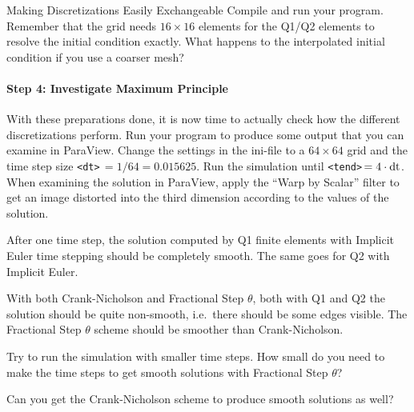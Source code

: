 \documentclass[12pt,a4paper]{article}
\begin{document}
\begin{Exercise}{Making Discretizations Easily Exchangeable}
  Compile and run your program.
  Remember that the grid needs $16\times16$ elements for the Q1/Q2 elements to
  resolve the initial condition exactly.  What happens to the interpolated
  initial condition if you use a coarser mesh?

  \paragraph{Step 4: Investigate Maximum Principle}

  \lstset{language=bash} With these preparations done, it is now time to
  actually check how the different discretizations perform.  Run your program
  to produce some output that you can examine in ParaView. Change the
  settings in the ini-file to a $64\times 64$ grid and the time step size
  \lstinline!<dt>!$\,=1/64=0.015625$. Run the simulation until
  \lstinline!<tend>!$\,=4 \cdot\textup{dt}$.
  When examining the solution in ParaView, apply the ``Warp by Scalar''
  filter to get an image distorted into the third dimension according to
  the values of the solution.

  After one time step, the solution computed by Q1 finite elements with
  Implicit Euler time stepping should be completely smooth.  The same goes for
  Q2 with Implicit Euler.

  With both Crank-Nicholson and Fractional Step $\theta$, both with Q1 and Q2
  the solution should be quite non-smooth, i.e.\ there should be some edges
  visible.  The Fractional Step $\theta$ scheme should be smoother than
  Crank-Nicholson.

  Try to run the simulation with smaller time steps.  How small do you need to
  make the time steps to get smooth solutions with Fractional Step $\theta$?

  Can you get the Crank-Nicholson scheme to produce smooth solutions as well?

\end{Exercise}
\end{document}
